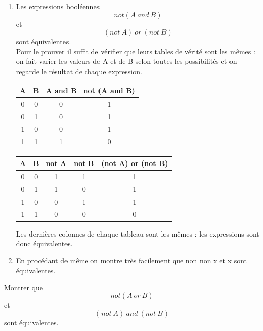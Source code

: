 \documentclass[a5paper,12pt,french]{book}
\begin{document}
\newpage
\begin{exemple}[s]
	\begin{enumerate}[\textbullet]
		\item 		Les expressions booléennes $$not(A\ and\ B)$$ et $$(not\ A)\ or\ (not\ B)$$ sont équivalentes.\\
		Pour le prouver il suffit de vérifier que leurs tables de vérité sont les mêmes : on fait varier les valeurs de A et de B selon toutes les possibilités et on regarde le résultat de chaque expression.
		\begin{center}
			\begin{tabular}{|c|c|c|c|}
				\hline\rowcolor{lightgray}
				A 	& B 	&  A and B	& not (A and B) \\
				\hline
				0 	& 0 	& 	0   	& \cellcolor{orange@color!25}	1         \\
				\hline
				0 	& 1 	& 	0   	& \cellcolor{orange@color!25}	1         \\
				\hline
				1 	& 0 	& 	0   	& \cellcolor{orange@color!25}	1         \\
				\hline
				1 	& 1 	& 	1   	& \cellcolor{orange@color!25}	0         \\
				\hline
			\end{tabular}\hspace{2em}
			\begin{tabular}{|c|c|c|c|c|}
				\hline\rowcolor{lightgray}
				A 	& B 	&  not A & not B	& (not A) or (not B)  \\
				\hline
				0 	& 0 	& 	1   & 	1       & \cellcolor{orange@color!25}	1\\
				\hline
				0 	& 1 	& 	1   & 	0       & \cellcolor{orange@color!25}	1\\
				\hline
				1 	& 0 	& 	0   & 	1       & \cellcolor{orange@color!25}	1\\
				\hline
				1 	& 1 	& 	0   & 	0 		&\cellcolor{orange@color!25}  0 \\
				\hline
			\end{tabular}
		\end{center}
		Les dernières colonnes de chaque tableau sont les mêmes : les expressions sont donc équivalentes.
		\item 	En procédant de même on montre très facilement que \og non non x\fg{} et \og x\fg{} sont équivalentes.	
	\end{enumerate}

\end{exemple}

\begin{exercice}[]
	Montrer que  $$not(A\ or\ B)$$ et $$(not\ A)\ and\ (not\ B)$$ sont équivalentes.\\
\end{exercice}
\end{document}
